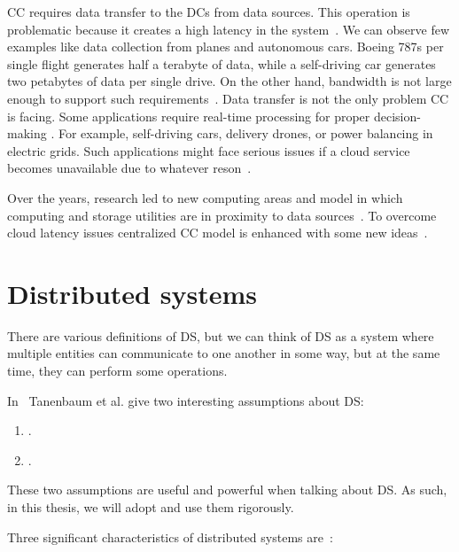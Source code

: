 CC requires data transfer to the DCs from data sources. This operation is problematic because it creates a high latency in the system~\cite{HossainRH18}. We can observe few examples like data collection from planes and autonomous cars. Boeing 787s per single flight generates half a terabyte of data, while a self-driving car generates two petabytes of data per single drive. On the other hand, bandwidth is not large enough to support such requirements~\cite{CaoZS18}. Data transfer is not the only problem CC is facing. Some applications require real-time processing for proper decision-making \cite{CaoZS18}. For example, self-driving cars, delivery drones, or power balancing in electric grids. Such applications might face serious issues if a cloud service becomes unavailable due to whatever reson~\cite{GunawiHSLSAE16}.

Over the years, research led to new computing areas and model in which computing and storage utilities are in proximity to data sources~\cite{Satyanarayanan17}. To overcome cloud latency issues centralized CC model is enhanced with some new ideas~\cite{NingLSY20}.
%
%
%
\section{Distributed systems}\label{sec:distributed_systems}
%
There are various definitions of DS, but we can think of DS as a system where multiple entities can communicate to one another in some way, but at the same time, they can perform some operations. 

In~\cite{SteenT16, 0019513} Tanenbaum et al. give two interesting assumptions about DS:

\begin{enumerate}[start=1,label={(\bfseries \arabic*)}]
	\item  {}.
	\item {}.\label{ds:asumption_2}
\end{enumerate}

\noindent
These two assumptions are useful and powerful when talking about DS. As such, in this thesis, we will adopt and use them rigorously.

Three significant characteristics of distributed systems are~\cite{0019513}: 

